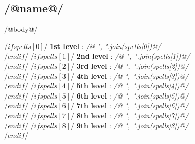 \subsection{/@name@/}
/@body@/

/$if spells[0]$/
\noindent\textbf{1st level} : \textit{/@ ", ".join(spells[0])@/}\\
/$endif$/
/$if spells[1]$/
\textbf{2nd level} : \textit{/@ ", ".join(spells[1])@/}\\
/$endif$/
/$if spells[2]$/
\textbf{3rd level} : \textit{/@ ", ".join(spells[2])@/}\\
/$endif$/
/$if spells[3]$/
\textbf{4th level} : \textit{/@ ", ".join(spells[3])@/}\\
/$endif$/
/$if spells[4]$/
\textbf{5th level} : \textit{/@ ", ".join(spells[4])@/}\\
/$endif$/
/$if spells[5]$/
\textbf{6th level} : \textit{/@ ", ".join(spells[5])@/}\\
/$endif$/
/$if spells[6]$/
\textbf{7th level} : \textit{/@ ", ".join(spells[6])@/}\\
/$endif$/
/$if spells[7]$/
\textbf{8th level} : \textit{/@ ", ".join(spells[7])@/}\\
/$endif$/
/$if spells[8]$/
\textbf{9th level} : \textit{/@ ", ".join(spells[8])@/}\\
/$endif$/
